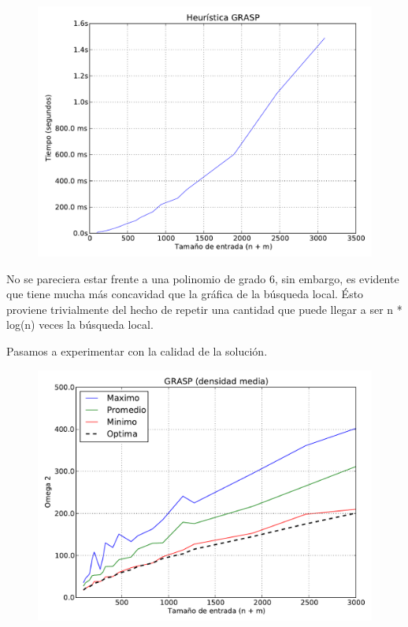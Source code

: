 \begin{figure}[H]
\begin{center}
\includegraphics[angle=0, scale=.75]{imagenes/grasp_2014-06-27_19-18-59.pdf}
\label{grafico local}
\end{center}
\end{figure}

No se pareciera estar frente a una polinomio de grado 6, sin embargo, es evidente que tiene mucha más concavidad que la gráfica de la búsqueda
local. Ésto proviene trivialmente del hecho de repetir una cantidad que puede llegar a ser n * log(n) veces la búsqueda local.

Pasamos a experimentar con la calidad de la solución.

\begin{figure}[H]
\begin{center}
\includegraphics[angle=0, scale=.75]{imagenes/calidad_grasp_2014-06-27_08-58-53.pdf}
\label{grafico local}
\end{center}
\end{figure}


